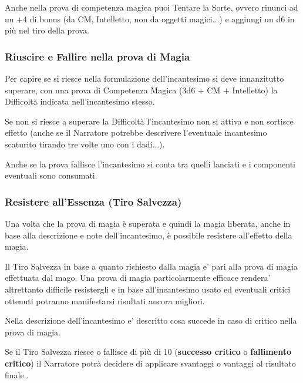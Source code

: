\begin{multicols}{2}
\label{tentare-la-sorte-con-la-magia}

Anche nella prova di competenza magica puoi Tentare la Sorte, ovvero rinunci ad un +4 di bonus (da CM, Intelletto, non da oggetti magici...) e aggiungi un d6 in più nel tiro della prova.

\subsubsection{Riuscire e Fallire nella prova di Magia}

Per capire se si riesce nella formulazione dell'incantesimo si deve innanzitutto superare, con una prova di Competenza Magica (3d6 + CM + Intelletto) la Difficoltà indicata nell'incantesimo stesso.

Se non si riesce a superare la Difficoltà l'incantesimo non si attiva e non sortisce effetto (anche se il Narratore potrebbe descrivere l'eventuale incantesimo scaturito tirando tre volte uno con i dadi...).

Anche se la prova fallisce l'incantesimo si conta tra quelli lanciati e i componenti eventuali sono consumati.

\subsubsection{Resistere all'Essenza (Tiro Salvezza)}

\label{resistere-allessenza-tiro-salvezza}

Una volta che la prova di magia è superata e quindi la magia liberata, anche in base alla descrizione e note dell'incantesimo, è possibile resistere all'effetto della magia.

Il Tiro Salvezza in base a quanto richiesto dalla magia e' pari alla prova di magia effettuata dal mago. Una prova di magia particolarmente efficace rendera' altrettanto difficile resistergli e in base all'incantesimo usato ed eventuali critici ottenuti potranno manifestarsi risultati ancora migliori.

Nella descrizione dell'incantesimo e' descritto cosa succede in caso di critico nella prova di magia.

Se il Tiro Salvezza riesce o fallisce di più di 10 (\textbf{successo critico} o \textbf{fallimento critico}) il Narratore potrà decidere di applicare svantaggi o vantaggi al risultato finale..


\end{multicols}
